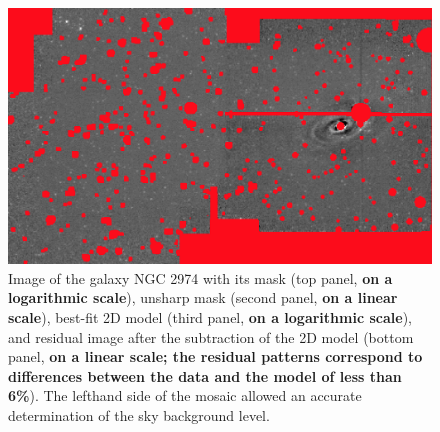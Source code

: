 \documentclass[preprint2]{emulateapj}
\begin{document}
\begin{figure}[h]
\begin{center}
\includegraphics[width=\columnwidth]{images/n2974_resid.jpeg}
\caption{Image of the galaxy NGC 2974 with its mask (top panel, {\bf on a logarithmic scale}), 
unsharp mask (second panel, {\bf on a linear scale}), 
best-fit 2D model (third panel, {\bf on a logarithmic scale}), 
and residual image after the subtraction of the 2D model (bottom panel, {\bf on a linear scale; 
the residual patterns correspond to differences between the data and the model of less than 6\%}).
The lefthand side of the mosaic allowed an accurate determination of the sky background level.}
\label{fig:n29742d}
\end{center}
\end{figure}
\end{document}
